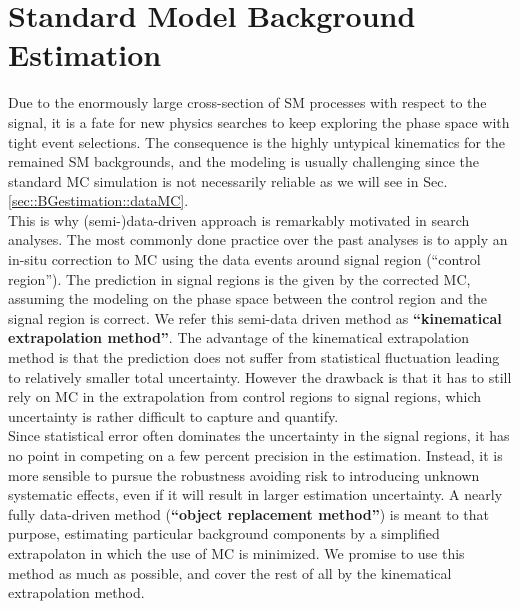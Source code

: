 \section{Standard Model Background Estimation} \label{sec::BGestimation}
Due to the enormously large cross-section of SM processes with respect to the signal,
it is a fate for new physics searches to keep exploring the phase space with tight event selections.
The consequence is the highly untypical kinematics for the remained SM backgrounds, and the modeling is usually challenging since the standard MC simulation is not necessarily reliable as we will see in Sec. \ref{sec::BGestimation::dataMC}. \\

This is why (semi-)data-driven approach is remarkably motivated in search analyses. 
The most commonly done practice over the past analyses is to apply an in-situ correction to MC using the data events around signal region (``control region''). The prediction in signal regions is the given by the corrected MC, assuming the modeling on the phase space between the control region and the signal region is correct. We refer this semi-data driven method as \textbf{``kinematical extrapolation method''}. The advantage of the kinematical extrapolation method is that the prediction does not suffer from statistical fluctuation leading to relatively smaller total uncertainty. However the drawback is that it has to still rely on MC in the extrapolation from control regions to signal regions, which uncertainty is rather difficult to capture and quantify. \\

Since statistical error often dominates the uncertainty in the signal regions,
it has no point in competing on a few percent precision in the estimation.
Instead, it is more sensible to pursue the robustness avoiding risk to introducing unknown systematic effects, even if it will result in larger estimation uncertainty.
A nearly fully data-driven method (\textbf{``object replacement method''}) is meant to that purpose,
estimating particular background components by a simplified extrapolaton in which the use of MC is minimized.
We promise to use this method as much as possible, and cover the rest of all by the kinematical extrapolation method. \\
%

